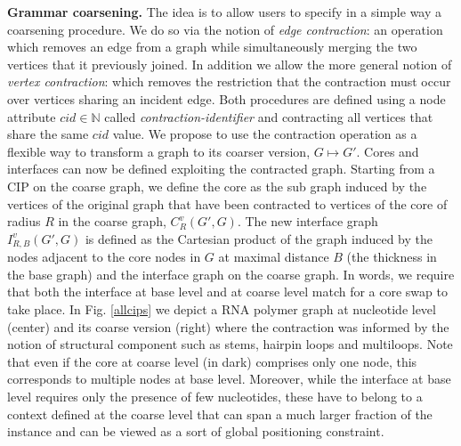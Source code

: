 \documentclass{article}
\newcommand*{\IN}[0]{\ensuremath{\mathbb{N}}}
\begin{document}
\textbf{Grammar coarsening.} The idea is to allow users to specify in a simple
way a coarsening procedure. We do so via the notion of {\em edge contraction}:
an operation which removes an edge from a graph while simultaneously merging
the two vertices that it previously joined. In addition we allow the more
general notion of {\em vertex contraction}: which removes the restriction that
the contraction must occur over vertices sharing an incident edge. Both
procedures are defined using a node attribute $cid \in \IN$ called {\em
contraction-identifier} and contracting all vertices that share the same $cid$
value. We propose to use the contraction operation as a flexible way to
transform a graph to its coarser version, $G \mapsto G'$. Cores and interfaces
can now be defined exploiting the contracted graph. Starting from a CIP on the
coarse graph, we define the core as the sub graph induced by the vertices of
the original graph that have been contracted to vertices of the core of radius
$R$ in the coarse graph, $C_R^v(G',G)$.  The new interface graph
$I_{R,B}^v(G',G)$ is defined as the Cartesian product of the graph induced by
the nodes adjacent to the core nodes in $G$ at maximal distance $B$ (the
thickness in the base graph) and the interface graph on the coarse graph. In
words, we require that both the interface at base level and at coarse level
match for a core swap to take place. In Fig. \ref{allcips}  we depict a RNA
polymer graph at nucleotide level (center) and its coarse version (right)
where the contraction was informed by the notion of structural component such
as stems, hairpin loops and multiloops. Note that even if the core at coarse
level (in dark) comprises only one node, this corresponds to multiple nodes at
base level. Moreover, while the interface at base level requires only the
presence of few nucleotides, these have to belong to a context defined at the
coarse level that can span a much larger fraction of the instance and can be
viewed as a sort of global positioning constraint.
\end{document}
